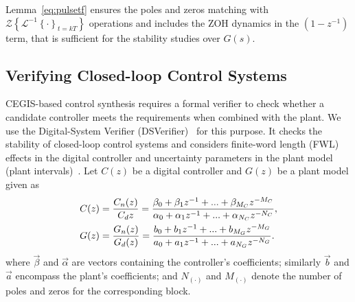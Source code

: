 \documentclass{sig-alternate-05-2015}
\newcommand{\red}[1]{{\color{red}#1}}
\begin{document}
Lemma~\ref{eq:pulsetf} ensures the poles and zeros matching with
$\mathcal{Z}\left\lbrace{\mathcal{L}^{-1}\left\lbrace{\cdot}\right\rbrace_{t=kT}}\right\rbrace$
operations and includes the ZOH dynamics in the $(1-z^{-1})$ term, that is
sufficient for the stability studies over $G(s)$.

\subsection{Verifying Closed-loop Control Systems}
\label{verifying-closed-loop-control-systems}




CEGIS-based control synthesis requires a formal verifier to check whether a
candidate controller meets the requirements when combined with the plant. 
We use the Digital-System Verifier (DSVerifier)~\cite{IsmailBCFF15} for this
purpose.  It checks the stability of closed-loop control systems and
considers finite-word length (FWL) effects in the digital controller and
uncertainty parameters in the plant model (plant intervals)~\cite{Bessa16}. 
Let $C(z)$ be a digital controller and $G(z)$ be a plant model given as
%
\begin{align}
\small
\label{controller_plant_tf}
C(z)&=\frac{C_n(z)}{C_d{z}}=\frac{\beta_{0}+\beta_{1}z^{-1}+...+\beta_{M_C}z^{-M_C}}{\alpha_{0}+\alpha_{1}z^{-1}+...+\alpha_{N_C}z^{-N_C}}, \\
G(z)&=\frac{G_n(z)}{G_d(z)}=\frac{b_{0}+b_{1}z^{-1}+...+b_{M_G}z^{-M_G}}{a_{0}+a_{1}z^{-1}+...+a_{N_G}z^{-N_G}}.
\end{align}
%
\noindent where $\vec{\beta}$ and $\vec{\alpha}$ are vectors containing the
controller's coefficients; similarly $\vec{b}$ and $\vec{a}$ encompass the
plant's coefficients; and $N_{(\cdot)}$ and $M_{(\cdot)}$ denote the number
of poles and zeros for the corresponding block.
\end{document}

